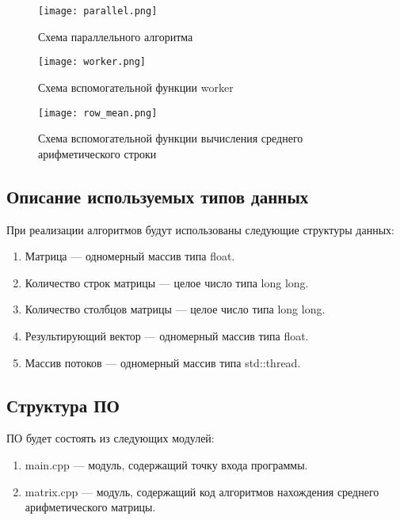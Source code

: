 \begin{figure}[H]
    \centering
    \texttt{[image: parallel.png]}
    \caption{Схема параллельного алгоритма}
    \label{img:parallel}
\end{figure}

\begin{figure}[H]
    \centering
    \texttt{[image: worker.png]}
    \caption{Схема вспомогательной функции worker}
    \label{img:worker}
\end{figure}

\begin{figure}[H]
    \centering
    \texttt{[image: row\_mean.png]}
    \caption{Схема вспомогательной функции вычисления среднего арифметического строки}
    \label{img:row_mean}
\end{figure}


\subsection{Описание используемых типов данных}

При реализации алгоритмов будут использованы следующие структуры данных:

\begin{enumerate}
	\item Матрица --- одномерный массив типа float.
	\item Количество строк матрицы --- целое число типа long long.
	\item Количество столбцов матрицы --- целое число типа long long.
	\item Результирующий вектор --- одномерный массив типа float.
	\item Массив потоков --- одномерный массив типа std::thread.
\end{enumerate}

\subsection{Структура ПО}

ПО будет состоять из следующих модулей:

\begin{enumerate}
	\item main.cpp --- модуль, содержащий точку входа программы.
	\item matrix.cpp --- модуль, содержащий код алгоритмов нахождения среднего арифметического матрицы.
\end{enumerate}

